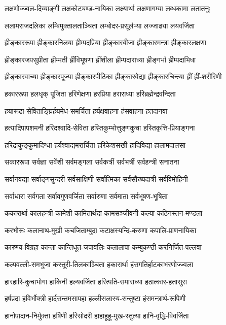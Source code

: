 \twolineshloka
{लक्षणोज्ज्वल-दिव्याङ्गी लक्षकोट्यण्ड-नायिका}
{लक्ष्यार्था लक्षणागम्या लब्धकामा लतातनुः}

\twolineshloka
{ललामराजदलिका लम्बिमुक्तालताञ्चिता}
{लम्बोदर-प्रसूर्लभ्या लज्जाढ्या लयवर्जिता}

\twolineshloka
{ह्रीङ्काररूपा ह्रीङ्कारनिलया ह्रीम्पदप्रिया}
{ह्रीङ्कारबीजा ह्रीङ्कारमन्त्रा ह्रीङ्कारलक्षणा}

\twolineshloka
{ह्रीङ्कारजपसुप्रीता ह्रीम्मती ह्रींविभूषणा}
{ह्रींशीला ह्रीम्पदाराध्या ह्रीङ्गर्भा ह्रीम्पदाभिधा}

\twolineshloka
{ह्रीङ्कारवाच्या ह्रीङ्कारपूज्या ह्रीङ्कारपीठिका}
{ह्रीङ्कारवेद्या ह्रीङ्कारचिन्त्या ह्रीं ह्रीं-शरीरिणी}

\twolineshloka
{हकाररूपा हलधृक् पूजिता हरिणेक्षणा}
{हरप्रिया हराराध्या हरिब्रह्मेन्द्रवन्दिता}

\twolineshloka
{हयारूढा-सेविताङ्घ्रिर्हयमेध-समर्चिता}
{हर्यक्षवाहना हंसवाहना हतदानवा}

\twolineshloka
{हत्यादिपापशमनी हरिदश्वादि-सेविता}
{हस्तिकुम्भोत्तुङ्गकुचा हस्तिकृत्ति-प्रियाङ्गना}

\twolineshloka
{हरिद्राकुङ्कुमादिग्धा हर्यश्वाद्यमरार्चिता}
{हरिकेशसखी हादिविद्या हालामदालसा}

\twolineshloka
{सकाररूपा सर्वज्ञा सर्वेशी सर्वमङ्गला}
{सर्वकर्त्री सर्वभर्त्री सर्वहन्त्री सनातना}

\twolineshloka
{सर्वानवद्या सर्वाङ्गसुन्दरी सर्वसाक्षिणी}
{सर्वात्मिका सर्वसौख्यदात्री सर्वविमोहिनी}

\twolineshloka
{सर्वाधारा सर्वगता सर्वावगुणवर्जिता}
{सर्वारुणा सर्वमाता सर्वभूषण-भूषिता}

\twolineshloka
{ककारार्था कालहन्त्री कामेशी कामितार्थदा}
{कामसञ्जीवनी कल्या कठिनस्तन-मण्डला}

\twolineshloka
{करभोरूः कलानाथ-मुखी कचजिताम्बुदा}
{कटाक्षस्यन्दि-करुणा कपालि-प्राणनायिका}

\twolineshloka
{कारुण्य-विग्रहा कान्ता कान्तिधूत-जपावलिः}
{कलालापा कम्बुकण्ठी करनिर्जित-पल्लवा}

\twolineshloka
{कल्पवल्ली-समभुजा कस्तूरी-तिलकाञ्चिता}
{हकारार्था हंसगतिर्हाटकाभरणोज्ज्वला}

\twolineshloka
{हारहारि-कुचाभोगा हाकिनी हल्यवर्जिता}
{हरित्पति-समाराध्या हठात्कार-हतासुरा}

\twolineshloka
{हर्षप्रदा हविर्भोक्त्री हार्दसन्तमसापहा}
{हल्लीसलास्य-सन्तुष्टा हंसमन्त्रार्थ-रूपिणी}

\twolineshloka
{हानोपादान-निर्मुक्ता हर्षिणी हरिसोदरी}
{हाहाहूहू-मुख-स्तुत्या हानि-वृद्धि-विवर्जिता}

